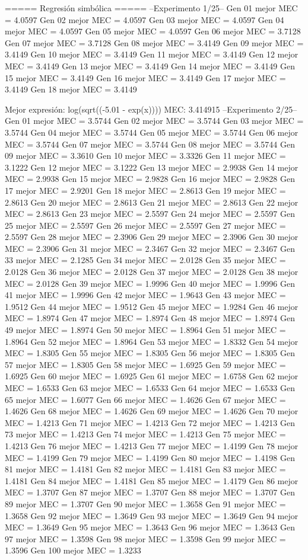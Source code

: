 ===== Regresión simbólica =====
--Experimento 
 1/25--
Gen 01 mejor MEC = 4.0597
Gen 02 mejor MEC = 4.0597
Gen 03 mejor MEC = 4.0597
Gen 04 mejor MEC = 4.0597
Gen 05 mejor MEC = 4.0597
Gen 06 mejor MEC = 3.7128
Gen 07 mejor MEC = 3.7128
Gen 08 mejor MEC = 3.4149
Gen 09 mejor MEC = 3.4149
Gen 10 mejor MEC = 3.4149
Gen 11 mejor MEC = 3.4149
Gen 12 mejor MEC = 3.4149
Gen 13 mejor MEC = 3.4149
Gen 14 mejor MEC = 3.4149
Gen 15 mejor MEC = 3.4149
Gen 16 mejor MEC = 3.4149
Gen 17 mejor MEC = 3.4149
Gen 18 mejor MEC = 3.4149

Mejor expresión: log(sqrt((-5.01 - exp(x))))
MEC: 3.414915
--Experimento 
 2/25--
Gen 01 mejor MEC = 3.5744
Gen 02 mejor MEC = 3.5744
Gen 03 mejor MEC = 3.5744
Gen 04 mejor MEC = 3.5744
Gen 05 mejor MEC = 3.5744
Gen 06 mejor MEC = 3.5744
Gen 07 mejor MEC = 3.5744
Gen 08 mejor MEC = 3.5744
Gen 09 mejor MEC = 3.3610
Gen 10 mejor MEC = 3.3326
Gen 11 mejor MEC = 3.1222
Gen 12 mejor MEC = 3.1222
Gen 13 mejor MEC = 2.9938
Gen 14 mejor MEC = 2.9938
Gen 15 mejor MEC = 2.9828
Gen 16 mejor MEC = 2.9828
Gen 17 mejor MEC = 2.9201
Gen 18 mejor MEC = 2.8613
Gen 19 mejor MEC = 2.8613
Gen 20 mejor MEC = 2.8613
Gen 21 mejor MEC = 2.8613
Gen 22 mejor MEC = 2.8613
Gen 23 mejor MEC = 2.5597
Gen 24 mejor MEC = 2.5597
Gen 25 mejor MEC = 2.5597
Gen 26 mejor MEC = 2.5597
Gen 27 mejor MEC = 2.5597
Gen 28 mejor MEC = 2.3906
Gen 29 mejor MEC = 2.3906
Gen 30 mejor MEC = 2.3906
Gen 31 mejor MEC = 2.3467
Gen 32 mejor MEC = 2.3467
Gen 33 mejor MEC = 2.1285
Gen 34 mejor MEC = 2.0128
Gen 35 mejor MEC = 2.0128
Gen 36 mejor MEC = 2.0128
Gen 37 mejor MEC = 2.0128
Gen 38 mejor MEC = 2.0128
Gen 39 mejor MEC = 1.9996
Gen 40 mejor MEC = 1.9996
Gen 41 mejor MEC = 1.9996
Gen 42 mejor MEC = 1.9643
Gen 43 mejor MEC = 1.9512
Gen 44 mejor MEC = 1.9512
Gen 45 mejor MEC = 1.9284
Gen 46 mejor MEC = 1.8974
Gen 47 mejor MEC = 1.8974
Gen 48 mejor MEC = 1.8974
Gen 49 mejor MEC = 1.8974
Gen 50 mejor MEC = 1.8964
Gen 51 mejor MEC = 1.8964
Gen 52 mejor MEC = 1.8964
Gen 53 mejor MEC = 1.8332
Gen 54 mejor MEC = 1.8305
Gen 55 mejor MEC = 1.8305
Gen 56 mejor MEC = 1.8305
Gen 57 mejor MEC = 1.8305
Gen 58 mejor MEC = 1.6925
Gen 59 mejor MEC = 1.6925
Gen 60 mejor MEC = 1.6925
Gen 61 mejor MEC = 1.6758
Gen 62 mejor MEC = 1.6533
Gen 63 mejor MEC = 1.6533
Gen 64 mejor MEC = 1.6533
Gen 65 mejor MEC = 1.6077
Gen 66 mejor MEC = 1.4626
Gen 67 mejor MEC = 1.4626
Gen 68 mejor MEC = 1.4626
Gen 69 mejor MEC = 1.4626
Gen 70 mejor MEC = 1.4213
Gen 71 mejor MEC = 1.4213
Gen 72 mejor MEC = 1.4213
Gen 73 mejor MEC = 1.4213
Gen 74 mejor MEC = 1.4213
Gen 75 mejor MEC = 1.4213
Gen 76 mejor MEC = 1.4213
Gen 77 mejor MEC = 1.4199
Gen 78 mejor MEC = 1.4199
Gen 79 mejor MEC = 1.4199
Gen 80 mejor MEC = 1.4198
Gen 81 mejor MEC = 1.4181
Gen 82 mejor MEC = 1.4181
Gen 83 mejor MEC = 1.4181
Gen 84 mejor MEC = 1.4181
Gen 85 mejor MEC = 1.4179
Gen 86 mejor MEC = 1.3707
Gen 87 mejor MEC = 1.3707
Gen 88 mejor MEC = 1.3707
Gen 89 mejor MEC = 1.3707
Gen 90 mejor MEC = 1.3658
Gen 91 mejor MEC = 1.3658
Gen 92 mejor MEC = 1.3649
Gen 93 mejor MEC = 1.3649
Gen 94 mejor MEC = 1.3649
Gen 95 mejor MEC = 1.3643
Gen 96 mejor MEC = 1.3643
Gen 97 mejor MEC = 1.3598
Gen 98 mejor MEC = 1.3598
Gen 99 mejor MEC = 1.3596
Gen 100 mejor MEC = 1.3233

